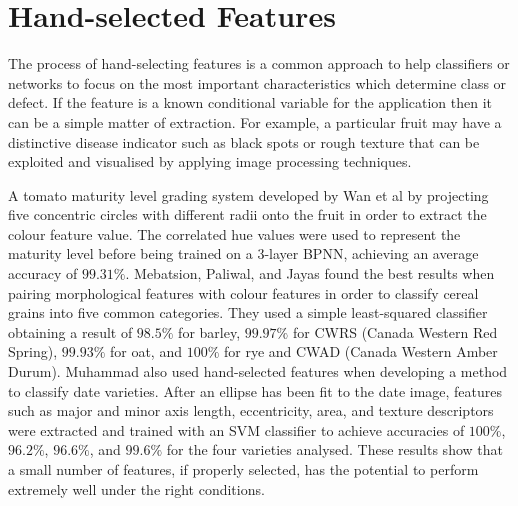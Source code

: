 \documentclass[fleqn,twoside,12pt]{report}
\begin{document}
\section{Hand-selected Features}

The process of hand-selecting features is a common approach to help classifiers or networks to focus on the most important characteristics which determine class or defect. If the feature is a known conditional variable for the application then it can be a simple matter of extraction. For example, a particular fruit may have a distinctive disease indicator such as black spots or rough texture that can be exploited and visualised by applying image processing techniques. 

A tomato maturity level grading system developed by Wan et al \cite{wan} by projecting five concentric circles with different radii onto the fruit in order to extract the colour feature value. The correlated hue values were used to represent the maturity level before being trained on a 3-layer BPNN, achieving an average accuracy of $99.31\%$. Mebatsion, Paliwal, and Jayas \cite{mebatsion} found the best results when pairing morphological features with colour features in order to classify cereal grains into five common categories. They used a simple least-squared classifier obtaining a result of $98.5\%$ for barley, $99.97\%$ for CWRS (Canada Western Red Spring), $99.93\%$ for oat, and $100\%$ for rye and CWAD (Canada Western Amber Durum). Muhammad \cite{muhammad} also used hand-selected features when developing a method to classify date varieties. After an ellipse has been fit to the date image, features such as major and minor axis length, eccentricity, area, and texture descriptors were extracted and trained with an SVM classifier to achieve accuracies of $100\%$, $96.2\%$, $96.6\%$, and $99.6\%$ for the four varieties analysed. These results show that a small number of features, if properly selected, has the potential to perform extremely well under the right conditions.
\end{document}
